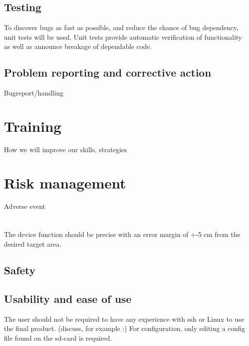 \documentclass{article}
\begin{document}
\subsection{Testing}

To discover bugs as fast as possible, and reduce the chance of bug dependency, unit tests will be used.
Unit tests provide automatic verification of functionality as well as announce breakage of dependable code.

\subsection{Problem reporting and corrective action}
Bugreport/handling
\section{Training}
How we will improve our skills, strategies
\section{Risk management}
Adverse event
\section{}

The device function should be precise with an error margin of +-5 cm from the desired target area. 

\subsection{Safety}

\subsection{Usability and ease of use}
The user should not be required to have any experience with ssh or Linux to use the final product. (discuss, for example :) For configuration, only editing a config file found on the sd-card is required.
\end{document}
